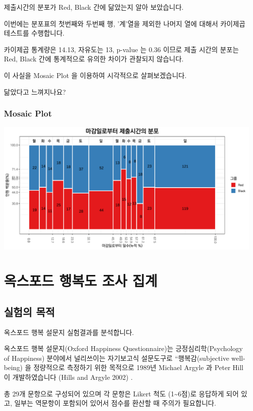 \documentclass[
]{book}
\begin{document}
제출시간의 분포가 Red, Black 간에 닮았는지 알아 보았습니다.

이번에는 분포표의 첫번째와 두번째 행, '계'열을 제외한 나머지 열에 대해서 카이제곱테스트를 수행합니다.

카이제곱 통계량은 14.13, 자유도는 13, p-value 는 0.36 이므로 제출 시간의 분포는 Red, Black 간에 통계적으로 유의한 차이가 관찰되지 않습니다.

이 사실을 Mosaic Plot 을 이용하여 시각적으로 살펴보겠습니다.

닮았다고 느껴지나요?

\subsection{Mosaic Plot}\label{mosaic-plot-19}

\includegraphics{Quiz_report_2025_files/figure-latex/unnamed-chunk-229-1.pdf}

\chapter{옥스포드 행복도 조사 집계}\label{uxc625uxc2a4uxd3ecuxb4dc-uxd589uxbcf5uxb3c4-uxc870uxc0ac-uxc9d1uxacc4}

\section{실험의 목적}\label{uxc2e4uxd5d8uxc758-uxbaa9uxc801-8}

옥스포드 행복 설문지 실험결과를 분석합니다.

옥스포드 행복 설문지(Oxford Happiness Questionnaire)는 긍정심리학(Psychology of Happiness) 분야에서 널리쓰이는 자기보고식 설문도구로 ``행복감(subjective well-being) 을 정량적으로 측정하기 위한 목적으로 1989년 Michael Argyle 과 Peter Hill 이 개발하였습니다 (Hills and Argyle 2002) .

총 29개 문항으로 구성되어 있으며 각 문항은 Likert 척도 (1\textasciitilde6점)로 응답하게 되어 있고, 일부는 역문항이 포함되어 있어서 점수를 환산할 때 주의가 필요합니다.
\end{document}
